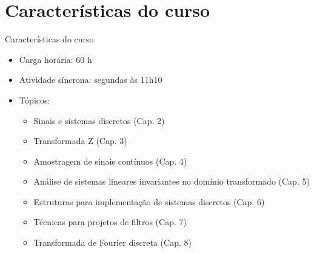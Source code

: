    \section[ slide = true]{Características do curso}
      \begin{slide}[toc=]{Características do curso}
         \begin{itemize}
            \item Carga horária: 60 h
            \item Atividade síncrona: segundas às 11h10
            \item Tópicos:
            \begin{itemize}
               \item Sinais e sistemas discretos (Cap. 2)
               \item Transformada Z (Cap. 3)
               \item Amostragem de sinais contínuos (Cap. 4)
               \item Análise de sistemas lineares invariantes no domínio transformado (Cap. 5)
               \item Estruturas para implementação de sistemas discretos (Cap. 6)
               \item Técnicas para projetos de filtros (Cap. 7)
               \item Transformada de Fourier discreta (Cap. 8)
            \end{itemize}
         \end{itemize}         
      \end{slide}
      

